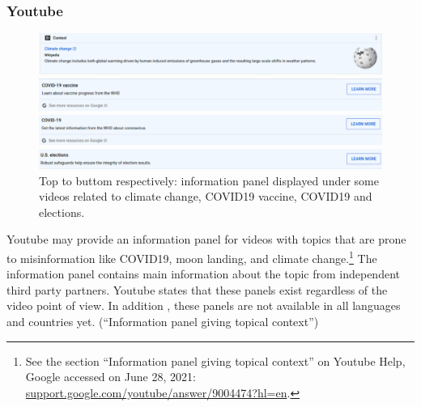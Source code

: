 \documentclass{article}
\begin{document}
\subsubsection{Youtube}

\begin{figure}
	\centering
	\begin{multicols}{1}
		\includegraphics[scale=0.2]{./img/youtube_panels/yt_1.png} 
	\end{multicols}
	\begin{multicols}{1}
		\includegraphics[scale=0.2]{./img/youtube_panels/yt_2.png} 
	\end{multicols}
	\begin{multicols}{1}
		\includegraphics[scale=0.2]{./img/youtube_panels/yt_3.png}
	\end{multicols}
	\begin{multicols}{1}
		\includegraphics[scale=0.2]{./img/youtube_panels/yt_4.png} 
	\end{multicols}
	\caption{Top to buttom respectively: information panel displayed under some videos related to climate change, COVID19 vaccine, COVID19 and elections.}
	\label{fig9}
\end{figure}

Youtube may provide an information panel for videos with topics that are prone to misinformation like COVID19, moon landing, and climate change.\footnote{See the section ``Information panel giving topical context'' on Youtube Help, Google accessed on June 28, 2021: \href{https://support.google.com/youtube/answer/9004474?hl=en}{support.google.com/youtube/answer/9004474?hl=en}.} The information panel contains main information about the topic from independent third party partners. Youtube states that these panels exist regardless of the video point of view. In addition , these panels are not available in all languages and countries yet. (“Information panel giving topical context”)
\end{document}
